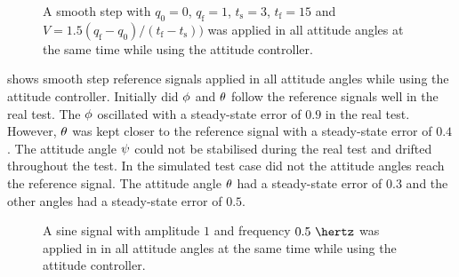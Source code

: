 \begin{figure}
\centering
  \qquad
  \qquad
  \qquad
  \qquad
  \qquad
  \caption{\label{fig:StepAllAttitude}%
 A smooth step with $q_{\text{0}} = 0$, $q_{\text{f}} = 1$, $t_{\text{s}} = 3$, $t_{\text{f}} = 15$ and $V = 1.5 (q_{\text{f}} - q_{\text{0}})/(t_{\text{f}} - t_{\text{s}}))$ was applied in all attitude angles at the same time while using the attitude controller.}
\end{figure}

 shows smooth step reference signals applied in all attitude angles while using the attitude controller. Initially did $\phi$ and $\theta$ follow the reference signals well in the real test. The $\phi$ oscillated with a steady-state error of $0.9$ in the real test. However, $\theta$ was kept closer to the reference signal with a steady-state error of $0.4$. The attitude angle $\psi$ could not be stabilised during the real test and drifted throughout the test. In the simulated test case did not the attitude angles reach the reference signal. The attitude angle $\theta$ had a steady-state error of $0.3$ and the other angles had a steady-state error of $0.5$.

\begin{figure}
\centering
  \qquad
  \qquad
  \qquad
  \qquad
  \qquad
  \caption{\label{fig:SinAllAttitude}%
   A sine signal with amplitude $1$ and frequency $0.5\ \hertz$ was applied in in all attitude angles at the same time while using the attitude controller.}
\end{figure}

